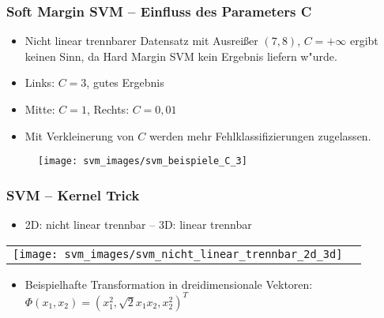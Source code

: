 
\begin{frame}

\frametitle{Soft Margin SVM -- Einfluss des Parameters C}

\begin{itemize}
	\setlength{\itemsep}{7pt}
	\item Nicht linear trennbarer Datensatz mit Ausrei{\ss}er $(7,8)$, $C=+\infty$ ergibt keinen Sinn, da Hard Margin SVM kein Ergebnis liefern w"urde.
	\item Links: $C=3$, gutes Ergebnis
	\item Mitte: $C=1$, Rechts: $C=0,01$
	\item Mit Verkleinerung von $C$ werden mehr Fehlklassifizierungen zugelassen.
\end{itemize}

\begin{figure}[h]
\centering
\texttt{[image: svm\_images/svm\_beispiele\_C\_3]}
\end{figure}

\end{frame}






\begin{frame}

\frametitle{SVM -- Kernel Trick}

\begin{itemize}
	\setlength{\itemsep}{10pt}
	\item 2D: nicht linear trennbar -- 3D: linear trennbar
\end{itemize}

\center
\begin{tabular}[h]{cl}
\texttt{[image: svm\_images/svm\_nicht\_linear\_trennbar\_2d\_3d]} &  {\tiny \cite{svmsuccinctly}}
\end{tabular}

\begin{itemize}
	\setlength{\itemsep}{10pt}
	\item Beispielhafte Transformation in dreidimensionale Vektoren: $\Phi(x_1,x_2)=(x_1^2,\sqrt{2}x_1 x_2,x_2^2)^T$
\end{itemize}

\end{frame}





